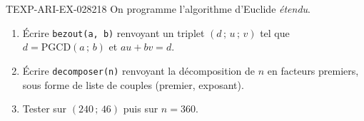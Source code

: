 % 
% 
% 
\begin{exercice}{TEXP-ARI-EX-028}{2}{18}
On programme l'algorithme d'Euclide \emph{étendu}.
\begin{enumerate}
  \item Écrire \texttt{bezout(a, b)} renvoyant un triplet
        $(d\,;\,u\,;\,v)$ tel que $d=\mathrm{PGCD}(a\,;\,b)$ et $au+bv=d$.
  \item Écrire \texttt{decomposer(n)} renvoyant la décomposition de $n$ en
        facteurs premiers, sous forme de liste de couples
        (premier, exposant).
  \item Tester sur $(240\,;\,46)$ puis sur $n=360$.
\end{enumerate}
\end{exercice}
